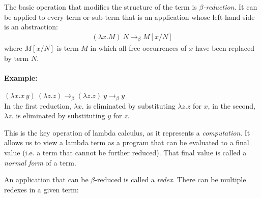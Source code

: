 \documentclass[11pt,twoside,a4paper]{article} %
\begin{document}
The basic operation that modifies the structure of the term is
\emph{$\beta$-reduction}. It can be applied to every term or sub-term that is
an application whose left-hand side is an abstraction:
\begin{align*}
(\lambda x.M)\ N\longrightarrow_\beta M[x/N]
\end{align*}
where $M[x/N]$ is term $M$ in which all free occurrences of $x$ have been
replaced by term $N$.

\paragraph{Example:} $(\lambda x.x\,y)\ (\lambda z.z)\longrightarrow_\beta
(\lambda z.z)\ y\longrightarrow_\beta y$\\
In the first reduction, $\lambda x.$ is eliminated by substituting $\lambda z.z$ 
for $x$, in the second, $\lambda z.$ is eliminated by substituting $y$ for $z$.

This is the key operation of lambda calculus, as it represents a
\emph{computation}. It allows us to view a lambda term as a program that can be
evaluated to a final value (i.e. a term that cannot be further reduced). That
final value is called a \emph{normal form} of a term.

An application that can be $\beta$-reduced is called a \emph{redex}. There can
be multiple redexes in a given term:
\begin{center}
\end{center}
\end{document}
